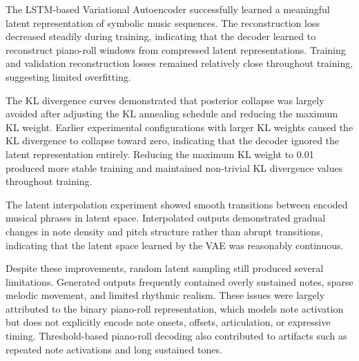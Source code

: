 \documentclass{article}
\theoremstyle{plain}
\theoremstyle{definition}
\theoremstyle{remark}
\begin{document}
The LSTM-based Variational Autoencoder successfully learned a meaningful latent representation of symbolic music sequences. The reconstruction loss decreased steadily during training, indicating that the decoder learned to reconstruct piano-roll windows from compressed latent representations. Training and validation reconstruction losses remained relatively close throughout training, suggesting limited overfitting.

The KL divergence curves demonstrated that posterior collapse was largely avoided after adjusting the KL annealing schedule and reducing the maximum KL weight. Earlier experimental configurations with larger KL weights caused the KL divergence to collapse toward zero, indicating that the decoder ignored the latent representation entirely. Reducing the maximum KL weight to 0.01 produced more stable training and maintained non-trivial KL divergence values throughout training.

The latent interpolation experiment showed smooth transitions between encoded musical phrases in latent space. Interpolated outputs demonstrated gradual changes in note density and pitch structure rather than abrupt transitions, indicating that the latent space learned by the VAE was reasonably continuous.

Despite these improvements, random latent sampling still produced several limitations. Generated outputs frequently contained overly sustained notes, sparse melodic movement, and limited rhythmic realism. These issues were largely attributed to the binary piano-roll representation, which models note activation but does not explicitly encode note onsets, offsets, articulation, or expressive timing. Threshold-based piano-roll decoding also contributed to artifacts such as repeated note activations and long sustained tones.
\begin{table}[h]
\centering
\caption{Comparison of Music Generation Models}
\label{tab:results}
\end{table}
\end{document}
